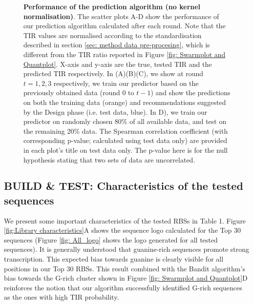 \documentclass{article}
\begin{document}
\begin{figure}[!ht]
\begin{subfigure}[b]{0.49\textwidth}
    \end{subfigure}
    \caption{\textbf{Performance of the prediction algorithm (no kernel normalisation)}. The scatter plots A-D show the performance of our prediction algorithm calculated after each round.
    Note that the TIR values are normalised according to the standardisation described in section \ref{sec: method data pre-procesing}, which is different from the TIR ratio reported in Figure \ref{fig: Swarmplot and Quantplot}.
    X-axis and y-axis are the true, tested TIR and the predicted TIR respectively.
    In (A)(B)(C), we show at round $t = 1,2,3$ respectively, we train our predictor based on the previously obtained data (round 0 to $t-1$) and show the predictions on both the training data (orange) and recommendations suggested by the Design phase (i.e. test data, blue).
    In D), we train our predictor on randomly chosen 80\% of all available data, and test on the remaining 20\% data.
    The Spearman correlation coefficient (with corresponding p-value; calculated using test data only) are provided in each plot's title on test data only.
    The p-value here is for the null hypothesis stating that two sets of data are uncorrelated.
    }
    \label{fig: Scatterplot}
\end{figure}

\subsection{BUILD \& TEST: Characteristics of the tested sequences}
\label{sec:characteristics-of-library}


We present some important characteristics of the tested RBSs in Table 1.
Figure \ref{fig:Library characteristics}A shows the sequence logo calculated for the Top 30 sequences (Figure \ref{fig: All_logo} shows the logo generated for all tested sequences).
It is generally understood that guanine-rich sequences promote strong transcription.
This expected bias towards guanine is clearly visible for all positions in our Top 30 RBSs.
This result combined with the Bandit algorithm's bias towards the G-rich cluster shown in Figure \ref{fig: Swarmplot and Quantplot}D reinforces the notion that our algorithm successfully identified G-rich sequences as the ones with high TIR probability.\\
\end{document}
